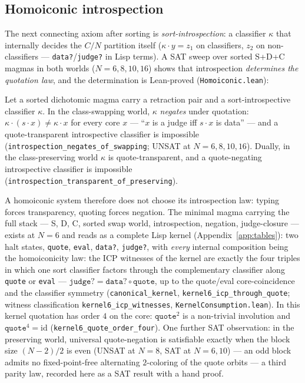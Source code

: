 \documentclass[sigconf,screen]{acmart}
\newcommand{\dotop}{\cdot}
\theoremstyle{remark}
\begin{document}
\subsection{Homoiconic introspection}
\label{sec:homoiconic}

The next connecting axiom after sorting is \emph{sort-introspection}: a classifier $\kappa$ that internally decides the $C/N$ partition itself ($\kappa \dotop y = z_1$ on classifiers, $z_2$ on non-classifiers --- \texttt{data?}/\texttt{judge?} in Lisp terms). A SAT sweep over sorted S+D+C magmas in both worlds ($N = 6, 8, 10, 16$) shows that introspection \emph{determines the quotation law}, and the determination is Lean-proved (\texttt{Homoiconic.lean}):

\begin{theorem}
\label{thm:introspection}
Let a sorted dichotomic magma carry a retraction pair and a sort-introspective classifier $\kappa$. In the class-swapping world, $\kappa$ \emph{negates} under quotation: $\kappa \dotop (s \dotop x) \neq \kappa \dotop x$ for every core $x$ --- ``$x$ is a judge iff $s \dotop x$ is data'' --- and a quote-transparent introspective classifier is impossible (\texttt{introspection\_negates\_of\_swapping}; UNSAT at $N = 6, 8, 10, 16$). Dually, in the class-preserving world $\kappa$ is quote-transparent, and a quote-negating introspective classifier is impossible (\texttt{introspection\_transparent\_of\_preserving}).
\end{theorem}

A homoiconic system therefore does not choose its introspection law: typing forces transparency, quoting forces negation. The minimal magma carrying the full stack --- S, D, C, sorted swap world, introspection, negation, judge-closure --- exists at $N\!=\!6$ and reads as a complete Lisp kernel (Appendix~\ref{app:tables}): two halt states, \texttt{quote}, \texttt{eval}, \texttt{data?}, \texttt{judge?}, with \emph{every} internal composition being the homoiconicity law: the ICP witnesses of the kernel are exactly the four triples in which one sort classifier factors through the complementary classifier along \texttt{quote} or \texttt{eval} --- $\texttt{judge?} = \texttt{data?} \circ \texttt{quote}$, up to the quote/eval core-coincidence and the classifier symmetry (\texttt{canonical\_kernel}, \texttt{kernel6\_icp\_through\_quote}; witness classification \texttt{kernel6\_icp\_witnesses}, \texttt{KernelConsumption.lean}). In this kernel quotation has order $4$ on the core: $\texttt{quote}^2$ is a non-trivial involution and $\texttt{quote}^4 = \mathrm{id}$ (\texttt{kernel6\_quote\_order\_four}). One further SAT observation: in the preserving world, universal quote-negation is satisfiable exactly when the block size $(N-2)/2$ is even (UNSAT at $N\!=\!8$, SAT at $N = 6, 10$) --- an odd block admits no fixed-point-free alternating $2$-coloring of the quote orbits --- a third parity law, recorded here as a SAT result with a hand proof.
\end{document}
